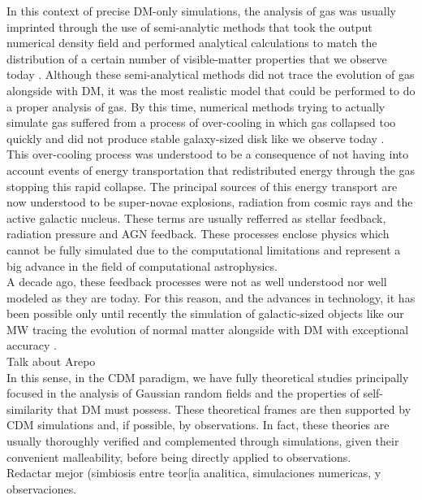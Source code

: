 In this context of precise DM-only simulations, the analysis of gas was usually imprinted through the use of semi-analytic methods that took the output numerical density field and performed analytical calculations to match the distribution of a certain number of visible-matter properties that we observe today \cite{Analytical methods}. Although these semi-analytical methods did not trace the evolution of gas alongside with DM, it was the most realistic model that could be performed to do a proper analysis of gas. By this time, numerical methods trying to actually simulate gas suffered from a process of over-cooling in which gas collapsed too quickly and did not produce stable galaxy-sized disk like we observe today \cite{cooling}.\\

This over-cooling process was understood to be a consequence of not having into account events of energy transportation that redistributed energy through the gas stopping this rapid collapse. The principal sources of this energy transport are now understood to be super-novae explosions, radiation from cosmic rays and the active galactic nucleus. These terms are usually refferred as stellar feedback, radiation pressure and AGN feedback. These processes enclose physics which cannot be fully simulated due to the computational limitations and represent a big advance in the field of computational astrophysics.\\

 A decade ago, these feedback processes were not as well understood nor well modeled as they are today. For this reason, and the advances in technology, it has been possible only until recently the simulation of galactic-sized objects like our MW tracing the evolution of normal matter alongside with DM with exceptional accuracy \cite{Auriga}.\\Talk about Arepo\\
 


In this sense, in the CDM paradigm, we have fully theoretical studies \cite{Bardeen et al. 1986,Schechter} principally focused in the analysis of Gaussian random fields and the properties of self-similarity that DM must possess. 
These theoretical frames are then supported by CDM simulations \cite{Cualquier estudio de CDM hace referencia a esos pilares} and, if possible, by observations. 
In fact, these theories are usually thoroughly verified and complemented through simulations, given their convenient malleability, before being directly applied to observations.\\ Redactar mejor (simbiosis entre teor[ia analitica, simulaciones numericas, y observaciones.


